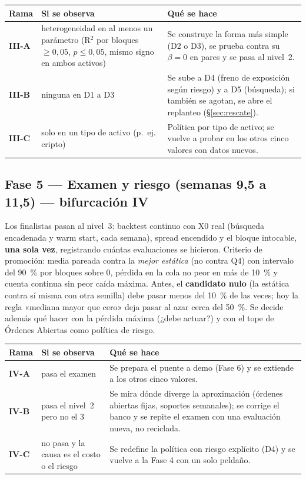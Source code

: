 \documentclass[11pt,a4paper]{article}
\begin{document}
\begin{table}[H]
\centering\small
\begin{tabularx}{\linewidth}{lXX}
\toprule
Rama & Si se observa & Qué se hace \\
\midrule
\textbf{III-A} & heterogeneidad en al menos un parámetro (R$^2$ por bloques $\geq 0{,}05$, $p\leq0{,}05$, mismo signo en ambos activos) & Se construye la forma más simple (D2 o D3), se prueba contra su $\beta=0$ en pares y se pasa al nivel~2. \\
\textbf{III-B} & ninguna en D1 a D3 & Se sube a D4 (freno de exposición según riesgo) y a D5 (búsqueda); si también se agotan, se abre el replanteo (§\ref{sec:rescate}). \\
\textbf{III-C} & solo en un tipo de activo (p.~ej. cripto) & Política por tipo de activo; se vuelve a probar en los otros cinco valores con datos nuevos. \\
\bottomrule
\end{tabularx}
\end{table}

\subsection{Fase 5 — Examen y riesgo (semanas 9,5 a 11,5) — bifurcación IV}
Los finalistas pasan al nivel~3: backtest continuo con X0 real (búsqueda encadenada y warm start, cada semana), spread
encendido y el bloque intocable, \textbf{una sola vez}, registrando cuántas evaluaciones se hicieron.
Criterio de promoción: media pareada contra la \emph{mejor estática} (no contra Q4) con intervalo del 90~\% por bloques
sobre 0, pérdida en la cola no peor en más de 10~\% y cuenta continua sin peor caída máxima. Antes, el \textbf{candidato nulo}
(la estática contra sí misma con otra semilla) debe pasar menos del 10~\% de las veces; hoy la regla «mediana mayor que
cero» deja pasar al azar cerca del 50~\%. Se decide además qué hacer con la pérdida máxima (¿debe actuar?) y con el tope
de Órdenes Abiertas como política de riesgo.

\begin{table}[H]
\centering\small
\begin{tabularx}{\linewidth}{lXX}
\toprule
Rama & Si se observa & Qué se hace \\
\midrule
\textbf{IV-A} & pasa el examen & Se prepara el puente a demo (Fase 6) y se extiende a los otros cinco valores. \\
\textbf{IV-B} & pasa el nivel~2 pero no el 3 & Se mira dónde diverge la aproximación (órdenes abiertas fijas, soportes semanales); se corrige el banco y se repite el examen con una evaluación nueva, no reciclada. \\
\textbf{IV-C} & no pasa y la causa es el costo o el riesgo & Se redefine la política con riesgo explícito (D4) y se vuelve a la Fase 4 con un solo peldaño. \\
\bottomrule
\end{tabularx}
\end{table}
\end{document}
